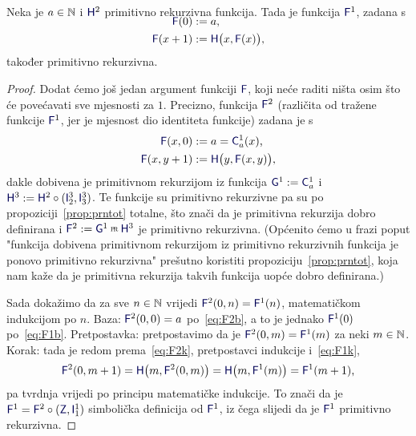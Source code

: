 \begin{propozicija}[{name=[jednomjesna funkcija primitivnom rekurzijom]}]\label{prop:F1prn}
Neka je $a\in{\mathbb N}$ i $\f H^2$ primitivno rekurzivna funkcija.
    \newline Tada je funkcija $\f F^1$, zadana s
\begin{align}
\SwapAboveDisplaySkip
\label{eq:F1b}
    \f F(0)&:=a\text,\\
\label{eq:F1k}
    \f F(x+1)&:=\f H\bigl(x,\f F(x)\bigr)\text,
\end{align}
također primitivno rekurzivna.
\end{propozicija}
\begin{proof}
Dodat ćemo još jedan argument funkciji $\f F$, koji neće raditi ništa osim što će povećavati sve mjesnosti za $1$. Precizno, funkcija $\f F^2$ (različita od tražene funkcije $\f F^1$\!, jer je mjesnost dio identiteta funkcije) zadana je s
\begin{align}
\label{eq:F2b}
    \f F(x,0)&:=a=\f C_a^1(x)\text,\\
\label{eq:F2k}
    \f F(x,y+1)&:=\f H\bigl(y,\f F(x,y)\bigr)\text,
\end{align}
dakle dobivena je primitivnom rekurzijom iz funkcija $\f G^1:=\f C_a^1$ i $\f H^3:=\f H^2\circ(\f I_2^3,\f I_3^3)$. Te funkcije su primitivno rekurzivne pa su po propoziciji~\ref{prop:prntot} totalne, što znači da je primitivna rekurzija dobro definirana i $\f F^2:=\f G^1\pr\f H^3$ je primitivno rekurzivna. (Općenito ćemo u frazi poput "funkcija dobivena primitivnom rekurzijom iz primitivno rekurzivnih funkcija je ponovo primitivno rekurzivna" prešutno koristiti propoziciju~\ref{prop:prntot}, koja nam kaže da je primitivna rekurzija takvih funkcija uopće dobro definirana.)

Sada dokažimo da za sve $n\in{\mathbb N}$ vrijedi $\f F^2(0,n)=\f F^1(n)$, matematičkom indukcijom po $n$. Baza: $\f F^2(0,0)=a$ po~\eqref{eq:F2b}, a to je jednako $\f F^1(0)$ po~\eqref{eq:F1b}. Pretpostavka: pretpostavimo da je $\f F^2(0,m)=\f F^1(m)$ za neki $m\in{\mathbb N}$. Korak: tada je redom prema~\eqref{eq:F2k}, pretpostavci indukcije i~\eqref{eq:F1k},
\begin{equation}
    \f F^2(0,m+1)=\f H\bigl(m,\f F^2(0,m)\bigr)=\f H\bigl(m,\f F^1(m)\bigr)=\f F^1(m+1)\text,
\end{equation}
pa tvrdnja vrijedi po principu matematičke indukcije. To znači da je $\f F^1=\f F^2\circ(\f Z,\f I_1^1)$ simbolička definicija od $\f F^1$, iz čega slijedi da je $\f F^1$ primitivno rekurzivna.
\end{proof}

